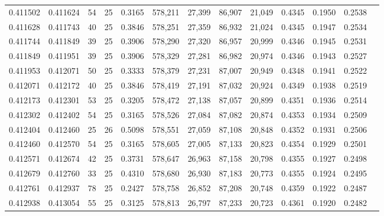 \begin{tabular}{rrrrrrrrrrrrr}
0.411502 & 0.411624 &    54 &  25 &                                     0.3165 & 578,211 &  27,399 &  86,907 &  21,049 & 0.4345 & 0.1950 & 0.2538 \\
0.411628 & 0.411743 &    40 &  25 &                                     0.3846 & 578,251 &  27,359 &  86,932 &  21,024 & 0.4345 & 0.1947 & 0.2534 \\
0.411744 & 0.411849 &    39 &  25 &                                     0.3906 & 578,290 &  27,320 &  86,957 &  20,999 & 0.4346 & 0.1945 & 0.2531 \\
0.411849 & 0.411951 &    39 &  25 &                                     0.3906 & 578,329 &  27,281 &  86,982 &  20,974 & 0.4346 & 0.1943 & 0.2527 \\
0.411953 & 0.412071 &    50 &  25 &                                     0.3333 & 578,379 &  27,231 &  87,007 &  20,949 & 0.4348 & 0.1941 & 0.2522 \\
0.412071 & 0.412172 &    40 &  25 &                                     0.3846 & 578,419 &  27,191 &  87,032 &  20,924 & 0.4349 & 0.1938 & 0.2519 \\
0.412173 & 0.412301 &    53 &  25 &                                     0.3205 & 578,472 &  27,138 &  87,057 &  20,899 & 0.4351 & 0.1936 & 0.2514 \\
0.412302 & 0.412402 &    54 &  25 &                                     0.3165 & 578,526 &  27,084 &  87,082 &  20,874 & 0.4353 & 0.1934 & 0.2509 \\
0.412404 & 0.412460 &    25 &  26 &                                     0.5098 & 578,551 &  27,059 &  87,108 &  20,848 & 0.4352 & 0.1931 & 0.2506 \\
0.412460 & 0.412570 &    54 &  25 &                                     0.3165 & 578,605 &  27,005 &  87,133 &  20,823 & 0.4354 & 0.1929 & 0.2501 \\
0.412571 & 0.412674 &    42 &  25 &                                     0.3731 & 578,647 &  26,963 &  87,158 &  20,798 & 0.4355 & 0.1927 & 0.2498 \\
0.412679 & 0.412760 &    33 &  25 &                                     0.4310 & 578,680 &  26,930 &  87,183 &  20,773 & 0.4355 & 0.1924 & 0.2495 \\
0.412761 & 0.412937 &    78 &  25 &                                     0.2427 & 578,758 &  26,852 &  87,208 &  20,748 & 0.4359 & 0.1922 & 0.2487 \\
0.412938 & 0.413054 &    55 &  25 &                                     0.3125 & 578,813 &  26,797 &  87,233 &  20,723 & 0.4361 & 0.1920 & 0.2482 \\

\end{tabular}

